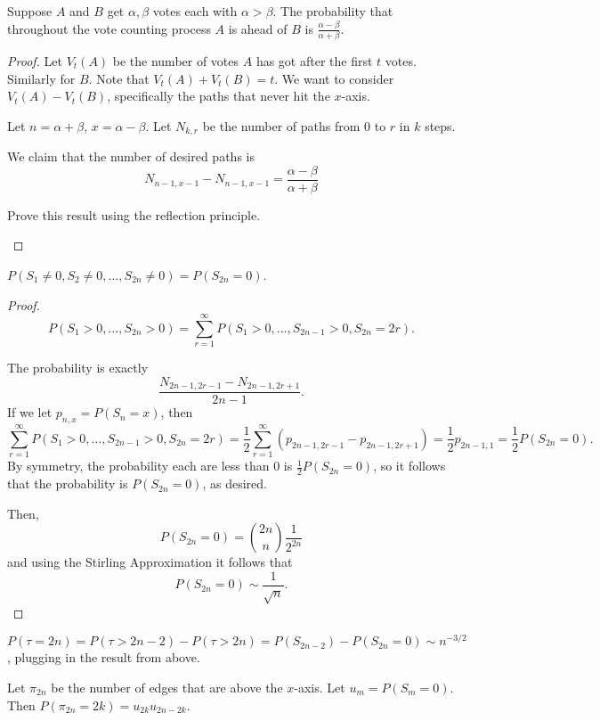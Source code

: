 \documentclass[11pt]{scrartcl}
\begin{document}
\begin{thm} Suppose $A$ and $B$ get $\alpha, \beta$ votes each with $\alpha > \beta$.  The probability that throughout the vote counting process $A$ is ahead of $B$ is $\frac{\alpha - \beta}{\alpha + \beta}$.
\end{thm}
\begin{proof}
Let $V_t(A)$ be the number of votes $A$ has got after the first $t$ votes.  Similarly for $B$.  Note that $V_t(A) + V_t(B) = t$.  We want to consider $V_t(A) - V_t(B)$, specifically the paths that never hit the $x$-axis.  

Let $n = \alpha + \beta$, $x = \alpha - \beta$.  Let $N_{k, r}$ be the number of paths from $0$ to $r$ in $k$ steps.  

We claim that the number of desired paths is 
$$N_{n-1, x-1} - N_{n-1, x-1} = \frac{\alpha - \beta}{\alpha + \beta}$$
\begin{exercise} Prove this result using the reflection principle.
\end{exercise}
\end{proof}
\begin{lemma} $P(S_1 \ne 0, S_2 \ne 0, \dots, S_{2n} \ne 0) = P(S_{2n} = 0)$.  
\end{lemma}
\begin{proof}
$$P(S_1 > 0, \dots, S_{2n} > 0) = \sum_{r=1}^{\infty} P(S_1 > 0, \dots, S_{2n-1} > 0, S_{2n} = 2r).$$

The probability is exactly
$$\frac{N_{2n-1, 2r-1} - N_{2n-1, 2r+1}}{2n-1}.$$
If we let $p_{n, x} = P(S_n = x)$, then
$$\sum_{r=1}^{\infty} P(S_1 > 0, \dots, S_{2n-1} > 0, S_{2n} = 2r) = \frac{1}{2}\sum_{r=1}^{\infty} (p_{2n-1, 2r-1} - p_{2n-1,2r+1 }) = \frac{1}{2}p_{2n-1, 1}= \frac{1}{2}P(S_{2n} = 0).$$
By symmetry, the probability each are less than $0$ is $\frac{1}{2}P(S_{2n} = 0)$, so it follows that the probability is $P(S_{2n} = 0)$, as desired.

Then, 
$$P(S_{2n} = 0) = \binom{2n}{n} \frac{1}{2^{2n}}$$
and using the Stirling Approximation it follows that 
$$P(S_{2n} = 0) \sim \frac{1}{\sqrt{n}}.$$


\end{proof}
\begin{lemma} $P(\tau = 2n) = P(\tau > 2n-2) - P(\tau > 2n) = P(S_{2n-2}) - P(S_{2n} = 0) \sim n^{-3/2}$, plugging in the result from above.
\end{lemma}

\begin{theorem}
Let $\pi_{2n}$ be the number of edges that are above the $x$-axis.  Let $u_m = P(S_{m} = 0)$.  Then $P(\pi_{2n} = 2k) = u_{2k} u_{2n-2k}.$
\end{theorem}
\end{document}
